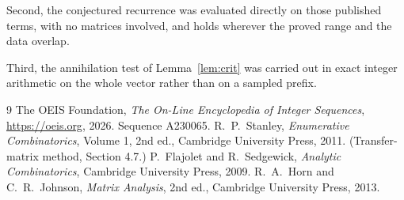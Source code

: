 \documentclass[11pt,a4paper]{article}
\theoremstyle{plain}
\theoremstyle{definition}
\begin{document}
Second, the conjectured recurrence was evaluated directly on those published terms, with no
matrices involved, and holds wherever the proved range and the data overlap.

Third, the annihilation test of Lemma~\ref{lem:crit} was carried out in exact integer
arithmetic on the whole vector rather than on a sampled prefix.

\begin{thebibliography}{9}
 The OEIS Foundation, \emph{The On-Line Encyclopedia of Integer
Sequences}, \url{https://oeis.org}, 2026. Sequence A230065.
 R.~P.~Stanley, \emph{Enumerative Combinatorics}, Volume 1, 2nd ed.,
Cambridge University Press, 2011. (Transfer-matrix method, Section 4.7.)
 P.~Flajolet and R.~Sedgewick, \emph{Analytic Combinatorics}, Cambridge
University Press, 2009.
 R.~A.~Horn and C.~R.~Johnson, \emph{Matrix Analysis}, 2nd ed., Cambridge
University Press, 2013.
\end{thebibliography}
\end{document}
